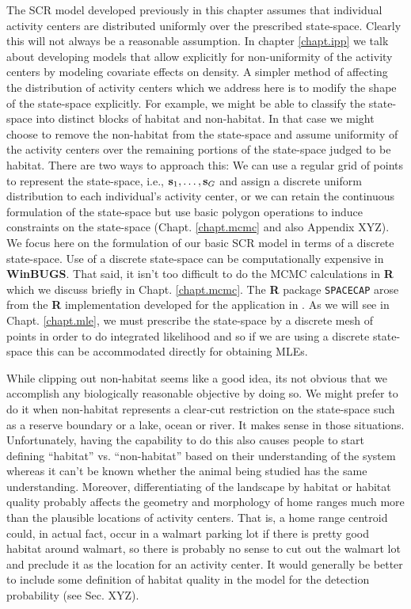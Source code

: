 The SCR model developed previously in this chapter assumes that
individual activity centers are distributed uniformly over the
prescribed state-space. Clearly this will not always be a reasonable
assumption. In chapter \ref{chapt.ipp} we talk about developing models that allow
explicitly for non-uniformity of the activity centers by modeling
covariate effects on density. A simpler method of affecting the
distribution of activity centers which we address here is to modify
the shape of the state-space explicitly. For example, we might be able
to classify the state-space into distinct blocks of habitat and
non-habitat. In that case we might choose to remove the non-habitat
from the state-space and assume uniformity of the activity centers
over the remaining portions of the state-space judged to be habitat.
There are two ways to approach this: We can use a regular grid of
points to represent the state-space, i.e., ${\bf s}_1, \ldots, {\bf s}_{G}$ and assign a
discrete uniform distribution to each individual's activity center, or
we can retain the continuous formulation of the state-space but use
basic polygon operations to induce constraints on the state-space
(Chapt. \ref{chapt.mcmc} and also Appendix XYZ). We focus here on the formulation
of our basic SCR model in terms of a discrete state-space.  Use of a
discrete state-space can be computationally expensive in {\bf WinBUGS}. That
said, it isn't too difficult to do the MCMC calculations in {\bf R} which we
discuss briefly in Chapt. \ref{chapt.mcmc}. The {\bf R} package {\tt SPACECAP}
\citep{gopalaswamy_etal:2011} arose from the {\bf R} implementation
developed for the application in \citet{royle_etal:2009}.
As we will see in Chapt. \ref{chapt.mle}, we must prescribe the
state-space by a discrete mesh of points in order to do integrated
likelihood and so if we are using a discrete state-space this can be
accommodated directly for obtaining MLEs.  

While clipping out
non-habitat seems like a good idea, its not obvious that we accomplish
any biologically reasonable objective by doing so. We might prefer to
do it when non-habitat represents a clear-cut restriction on the
state-space such as a reserve boundary or a lake, ocean or river. It
makes sense in those situations.  Unfortunately, having the capability
to do this also causes people to start defining ``habitat''
vs. ``non-habitat'' based on their understanding of the system whereas
it can't be known whether the animal being studied has the same
understanding. Moreover, differentiating of the landscape by habitat
or habitat quality probably affects the geometry and morphology of
home ranges much more than the plausible locations of activity
centers. That is, a home range centroid could, in actual fact, occur
in a walmart parking lot if there is pretty good habitat around
walmart, so there is probably no sense to cut out the walmart lot and
preclude it as the location for an activity center.  It would
generally be better to include some definition of habitat quality in
the model for the detection probability (see Sec. XYZ).


